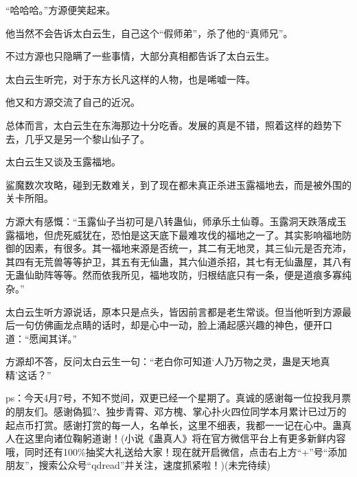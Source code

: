 \begin{this_body}
“哈哈哈。”方源便笑起来。

他当然不会告诉太白云生，自己这个“假师弟”，杀了他的“真师兄”。

不过方源也只隐瞒了一些事情，大部分真相都告诉了太白云生。

太白云生听完，对于东方长凡这样的人物，也是唏嘘一阵。

他又和方源交流了自己的近况。

总体而言，太白云生在东海那边十分吃香。发展的真是不错，照着这样的趋势下去，几乎又是另一个黎山仙子了。

太白云生又谈及玉露福地。

鲨魔数次攻略，碰到无数难关，到了现在都未真正杀进玉露福地去，而是被外围的关卡所阻。

方源大有感慨：“玉露仙子当初可是八转蛊仙，师承乐土仙尊。玉露洞天跌落成玉露福地，但虎死威犹在，恐怕是这天底下最难攻伐的福地之一了。其实影响福地防御的因素，有很多。其一福地来源是否统一，其二有无地灵，其三仙元是否充沛，其四有无荒兽等等护卫，其五有无仙蛊，其六仙道杀招，其七有无仙蛊屋，其八有无蛊仙助阵等等。然而依我所见，福地攻防，归根结底只有一条，便是道痕多寡纯杂。”

太白云生听方源说话，原本只是点头，皆因前言都是老生常谈。但当他听到方源最后一句仿佛画龙点睛的话时，却是心中一动，脸上涌起感兴趣的神色，便开口道：“愿闻其详。”

方源却不答，反问太白云生一句：“老白你可知道‘人乃万物之灵，蛊是天地真精’这话？”

ps：今天4月7号，不知不觉间，双更已经一个星期了。真诚的感谢每一位投我月票的朋友们。感谢偽狐?、独步青霄、邓方槐、掌心扑火四位同学本月累计已过万的起点币打赏。感谢打赏的每一人，名单长，这里不细表，我都一一记在心中。蛊真人在这里向诸位鞠躬道谢！(小说《蛊真人》将在官方微信平台上有更多新鲜内容哦，同时还有100\%抽奖大礼送给大家！现在就开启微信，点击右上方“+”号“添加朋友”，搜索公众号“qdread”并关注，速度抓紧啦！)(未完待续)

\end{this_body}

